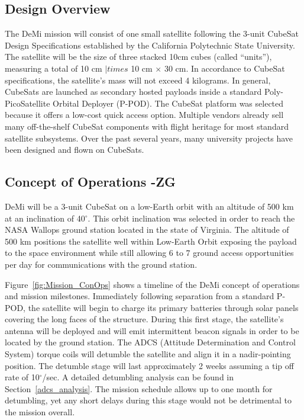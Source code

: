 \documentclass[12pt]{article}
\begin{document}
		\subsection{Design Overview}
		The DeMi mission will consist of one small satellite following the 3-unit CubeSat Design Specifications established by the California Polytechnic State University. The satellite will be the size of three stacked 10cm cubes (called “units”), measuring a total of 10 cm $|times$ 10 cm $\times$ 30 cm. In accordance to CubeSat specifications, the satellite’s mass will not exceed 4 kilograms. In general, CubeSats are launched as secondary hosted payloads inside a standard Poly-PicoSatellite Orbital Deployer (P-POD). \cite{cubesat-specs}
The CubeSat platform was selected because it offers a low-cost quick access option. Multiple vendors already sell many off-the-shelf CubeSat components with flight heritage for most standard satellite subsystems. Over the past several years, many university projects have been designed and flown on CubeSats. 

		
		\subsection{Concept of Operations -ZG}\label{sec:systems_conops}
		
		DeMi will be a 3-unit CubeSat on a low-Earth orbit with an altitude of 500 km at an inclination of 40$^\circ$. This orbit inclination was selected in order to reach the NASA Wallops ground station located in the state of Virginia. The altitude of 500 km positions the satellite well within Low-Earth Orbit exposing the payload to the space environment while still allowing 6 to 7 ground access opportunities per day for communications with the ground station. 

Figure~\ref{fig:Mission_ConOps} shows a timeline of the DeMi concept of operations and mission milestones. Immediately following separation from a standard P-POD, the satellite will begin to charge its primary batteries through solar panels covering the long faces of the structure. During this first stage, the satellite’s antenna will be deployed and will emit intermittent beacon signals in order to be located by the ground station. The ADCS (Attitude Determination and Control System) torque coils will detumble the satellite and align it in a nadir-pointing position. The detumble stage will last approximately 2 weeks assuming a tip off rate of 10$^\circ$/sec. A detailed detumbling analysis can be found in Section~\ref{adcs_analysis}. The mission schedule allows up to one month for detumbling, yet any short delays during this stage would not be detrimental to the mission overall.
\end{document}
